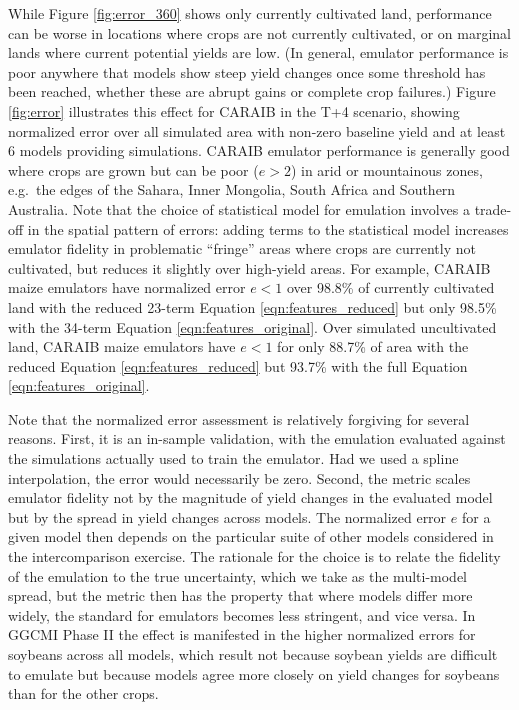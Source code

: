 \documentclass[gmdd]{copernicus} %
\begin{document}
While Figure \ref{fig:error_360} shows only currently cultivated land, performance can be worse in locations where crops are not currently cultivated, or on marginal lands where current potential yields are low. (In general, emulator performance is poor anywhere that models show steep yield changes once some threshold has been reached, whether these are abrupt gains or complete crop failures.) 
Figure \ref{fig:error} illustrates this effect for CARAIB in the T+4 scenario, showing normalized error over all simulated area with non-zero baseline yield and at least 6 models providing simulations. CARAIB emulator performance is generally good where crops are grown but can be poor ($e > 2$) in arid or mountainous zones, e.g.\ the edges of the Sahara, Inner Mongolia, South Africa and Southern Australia. %
Note that the choice of statistical model for emulation involves a trade-off in the spatial pattern of errors: adding terms to the statistical model increases emulator fidelity in problematic ``fringe'' areas where crops are currently not cultivated, but reduces it slightly over high-yield areas.
For example, CARAIB maize emulators have normalized error $e < 1$ over 98.8\% of currently cultivated land with the reduced 23-term Equation \ref{eqn:features_reduced} but only 98.5\% with the 34-term Equation \ref{eqn:features_original}. 
Over simulated uncultivated land, CARAIB maize emulators have $e < 1$ for only 88.7\% of area with the reduced Equation \ref{eqn:features_reduced} but 93.7\% with the full Equation \ref{eqn:features_original}. 

Note that the normalized error assessment is relatively forgiving for several reasons. 
First, it is an in-sample validation, with the emulation evaluated against the simulations actually used to train the emulator. 
Had we used a spline interpolation, the error would necessarily be zero. 
Second, the metric scales emulator fidelity not by the magnitude of yield changes in the evaluated model but by the spread in yield changes across models. 
The normalized error $e$ for a given model then depends on the particular suite of other models considered in the intercomparison exercise.  
The rationale for the choice is to relate the fidelity of the emulation to the true uncertainty, which we take as the multi-model spread, but  
the metric then has the property that where models differ more widely, the standard for emulators becomes less stringent, and vice versa.
In GGCMI Phase II the effect is manifested in the higher normalized errors for soybeans across all models, which result not because soybean yields are difficult to emulate but because models agree more closely on yield changes for soybeans than for the other crops.
\end{document}

